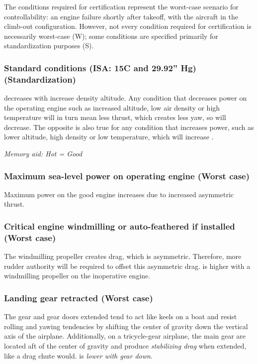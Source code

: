 The conditions required for certification represent the worst-case scenario
for controllability: an engine failure shortly after takeoff, with the
aircraft in the climb-out configuration. However, not every condition required for
certification is necessarily worst-case (W); some conditions are specified primarily
for standardization purposes (S).

\subsubsection{Standard conditions (ISA: 15\degree C and 29.92” Hg) (Standardization)}

\vmc decreases with increase density altitude. Any condition that decreases
power on the operating engine such as increased altitude, low air density or
high temperature will in turn mean less thrust, which creates less yaw, so \vmc
will decrease. The opposite is also true for any condition that increases power,
such as lower altitude, high density or low temperature, which will increase \vmc.

\emph{Memory aid: Hot = Good}

\subsubsection{Maximum sea-level power on operating engine (Worst case)}

Maximum power on the good engine increases \vmc due to increased asymmetric thrust.

\subsubsection{Critical engine windmilling or auto-feathered if installed (Worst case)}

The windmilling propeller creates drag, which is asymmetric. Therefore, more rudder
authority will be required to offset this asymmetric drag. \vmc is higher
with a windmilling propeller on the inoperative engine.

\subsubsection{Landing gear retracted (Worst case)}

The gear and gear doors extended tend to act like keels on a boat and resist rolling and yawing tendencies by
shifting the center of gravity down the vertical axis of the airplane. Additionally, on a tricycle-gear airplane, the
main gear are located aft of the center of gravity and produce \emph{stabilizing drag} when extended, like a drag chute
would. \vmc is \emph{lower with gear down}.

